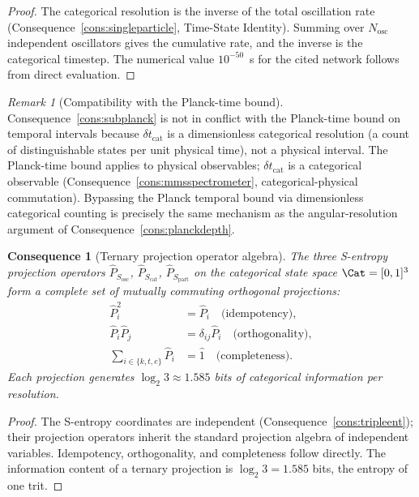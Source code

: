 \documentclass[11pt,twocolumn,a4paper]{article}
\theoremstyle{axiomstyle}
\theoremstyle{conseqstyle}
\newtheorem{consequence}{Consequence}
\theoremstyle{definition}
\theoremstyle{remark}
\newtheorem*{remark}{Remark}
\newcommand{\Sk}{S_{\mathrm{osc}}}
\newcommand{\St}{S_{\mathrm{cat}}}
\newcommand{\Se}{S_{\mathrm{part}}}
\begin{document}
\begin{proof}
The categorical resolution is the inverse of the total oscillation rate (Consequence~\ref{cons:singleparticle}, Time-State Identity). Summing over $N_{\mathrm{osc}}$ independent oscillators gives the cumulative rate, and the inverse is the categorical timestep. The numerical value $10^{-50}$~s for the cited network follows from direct evaluation.
\end{proof}

\begin{remark}[Compatibility with the Planck-time bound]
Consequence~\ref{cons:subplanck} is not in conflict with the Planck-time bound on temporal intervals because $\delta t_{\mathrm{cat}}$ is a dimensionless categorical resolution (a count of distinguishable states per unit physical time), not a physical interval. The Planck-time bound applies to physical observables; $\delta t_{\mathrm{cat}}$ is a categorical observable (Consequence~\ref{cons:mmsspectrometer}, categorical-physical commutation). Bypassing the Planck temporal bound via dimensionless categorical counting is precisely the same mechanism as the angular-resolution argument of Consequence~\ref{cons:planckdepth}.
\end{remark}

\begin{consequence}[Ternary projection operator algebra]\label{cons:ternaryproj}
The three S-entropy projection operators $\hat{P}_{\Sk}$, $\hat{P}_{\St}$, $\hat{P}_{\Se}$ on the categorical state space $\Cat=[0,1]^{3}$ form a complete set of mutually commuting orthogonal projections:
\begin{align}
\hat{P}_{i}^{2}&=\hat{P}_{i}\quad\text{(idempotency)},\\
\hat{P}_{i}\hat{P}_{j}&=\delta_{ij}\hat{P}_{i}\quad\text{(orthogonality)},\\
\sum_{i\in\{k,t,e\}}\hat{P}_{i}&=\hat{1}\quad\text{(completeness)}.
\end{align}
Each projection generates $\log_{2}3\approx 1.585$ bits of categorical information per resolution.
\end{consequence}

\begin{proof}
The S-entropy coordinates are independent (Consequence~\ref{cons:tripleent}); their projection operators inherit the standard projection algebra of independent variables. Idempotency, orthogonality, and completeness follow directly. The information content of a ternary projection is $\log_{2}3=1.585$ bits, the entropy of one trit.
\end{proof}
\end{document}
